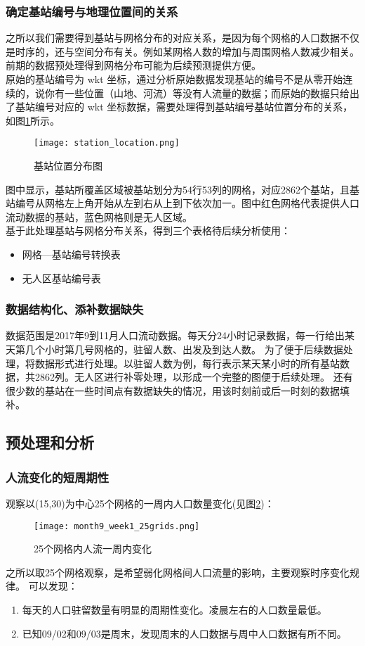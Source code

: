 \subsubsection*{确定基站编号与地理位置间的关系}
之所以我们需要得到基站与网格分布的对应关系，是因为每个网格的人口数据不仅是时序的，还与空间分布有关。例如某网格人数的增加与周围网格人数减少相关。前期的数据预处理得到网格分布可能为后续预测提供方便。\\
\indent 原始的基站编号为 wkt 坐标，通过分析原始数据发现基站的编号不是从零开始连续的，说你有一些位置（山地、河流）等没有人流量的数据；而原始的数据只给出了基站编号对应的 wkt 坐标数据，需要处理得到基站编号基站位置分布的关系，如图\ref{fig:2.1}所示。
\begin{figure}[ht]
\centering
\texttt{[image: station\_location.png]}
\caption{基站位置分布图}
\label{fig:2.1}
\end{figure}
图中显示，基站所覆盖区域被基站划分为54行53列的网格，对应2862个基站，且基站编号从网格左上角开始从左到右从上到下依次加一。图中红色网格代表提供人口流动数据的基站，蓝色网格则是无人区域。\\
\indent 基于此处理基站与网格分布关系，得到三个表格待后续分析使用：
\begin{itemize}
	---网格行列转换表
	\item 网格---基站编号转换表
	\item 无人区基站编号表
\end{itemize}
\subsubsection*{数据结构化、添补数据缺失}
数据范围是2017年9到11月人口流动数据。每天分24小时记录数据，每一行给出某天第几个小时第几号网格的，驻留人数、出发及到达人数。
为了便于后续数据处理，将数据形式进行处理。以驻留人数为例，每行表示某天某小时的所有基站数据，共2862列。无人区进行补零处理，以形成一个完整的图便于后续处理。
还有很少数的基站在一些时间点有数据缺失的情况，用该时刻前或后一时刻的数据填补。
\subsection{预处理和分析}
\subsubsection*{人流变化的短周期性}
观察以(15,30)为中心25个网格的一周内人口数量变化(见图\ref{fig:2.2})：
\begin{figure}[ht]
\centering
\texttt{[image: month9\_week1\_25grids.png]}
\caption{25个网格内人流一周内变化}
\label{fig:2.2}
\end{figure}
之所以取25个网格观察，是希望弱化网格间人口流量的影响，主要观察时序变化规律。
\indent 可以发现：
\begin{enumerate}
	\item 每天的人口驻留数量有明显的周期性变化。凌晨左右的人口数量最低。
	\item 已知09/02和09/03是周末，发现周末的人口数据与周中人口数据有所不同。
\end{enumerate}
